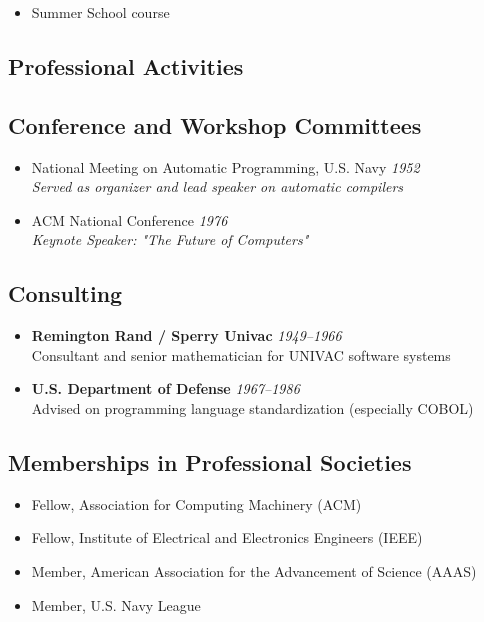 \documentclass[11pt]{report}
\newcommand{\dates}[1]{\hfill \textit{#1}}
\begin{document}
\begin{itemize}

\item Summer School course

\end{itemize}

\begin{internalonly}
\chapter{Professional Activities}
\end{internalonly}

\section{Conference and Workshop Committees}

\begin{itemize}
\item
  National Meeting on Automatic Programming, U.S. Navy \dates{1952} \\
  \emph{Served as organizer and lead speaker on automatic compilers}
\item
  ACM National Conference \dates{1976} \\
  \emph{Keynote Speaker: "The Future of Computers"}
\end{itemize}

\section{Consulting}

\begin{itemize}
\item
  \textbf{Remington Rand / Sperry Univac} \dates{1949--1966} \\
  Consultant and senior mathematician for UNIVAC software systems
\item
  \textbf{U.S. Department of Defense} \dates{1967--1986} \\
  Advised on programming language standardization (especially COBOL)
\end{itemize}

\section{Memberships in Professional Societies}

\begin{itemize}
\item Fellow, Association for Computing Machinery (ACM)
\item Fellow, Institute of Electrical and Electronics Engineers (IEEE)
\item Member, American Association for the Advancement of Science (AAAS)
\item Member, U.S. Navy League
\end{itemize}
\end{document}
